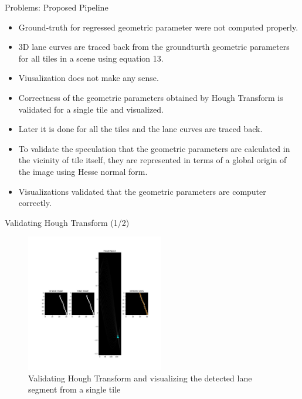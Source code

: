 \documentclass[aspectratio=169]{beamer}
\begin{document}
\begin{frame}{Problems: Proposed Pipeline}
    \begin{itemize}
        \item Ground-truth for regressed geometric parameter were not computed properly.
        \item 3D lane curves are traced back from the groundturth geometric parameters for all tiles in a scene using equation 13. 
        \item Viusalization does not make any sense.
        \item Correctness of the geometric parameters obtained by Hough Transform is validated for a single tile and visualized.
        \item Later it is done for all the tiles and the lane curves are traced back.
        \item To validate the speculation that the geometric parameters are calculated in the vicinity of tile itself, they are represented in terms of a global origin of the image using Hesse normal form.
        \item Visualizations validated that the geometric parameters are computer correctly.
    \end{itemize}
\end{frame}
\begin{frame}{Validating Hough Transform (1/2)}
    \begin{figure}[h]
      
        \centering
        \includegraphics[width=0.6\linewidth, height=6cm]{images/hough_validation.jpg} 
        \caption{Validating Hough Transform and visualizing the detected lane segment from a single tile}
        \end{figure}
\end{frame}
\end{document}
